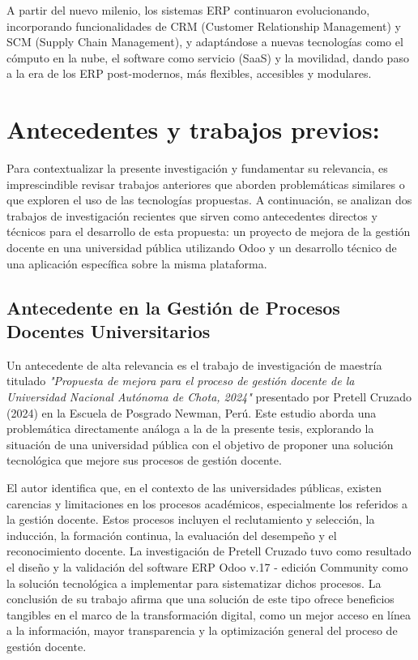 \documentclass[12pt,letterpaper,spanish]{report}
\begin{document}
A partir del nuevo milenio, los sistemas ERP continuaron evolucionando, incorporando funcionalidades de CRM (Customer Relationship Management) y SCM (Supply Chain Management), y adaptándose a nuevas tecnologías como el cómputo en la nube, el software como servicio (SaaS) y la movilidad, dando paso a la era de los ERP post-modernos, más flexibles, accesibles y modulares.
\section{Antecedentes y trabajos previos:}
\label{sec:antecedentes}

Para contextualizar la presente investigación y fundamentar su relevancia, es imprescindible revisar trabajos anteriores que aborden problemáticas similares o que exploren el uso de las tecnologías propuestas. A continuación, se analizan dos trabajos de investigación recientes que sirven como antecedentes directos y técnicos para el desarrollo de esta propuesta: un proyecto de mejora de la gestión docente en una universidad pública utilizando Odoo y un desarrollo técnico de una aplicación específica sobre la misma plataforma.

\subsection{Antecedente en la Gestión de Procesos Docentes Universitarios}
\label{sub:antecedente_gestion_docente}

Un antecedente de alta relevancia es el trabajo de investigación de maestría titulado \textit{"Propuesta de mejora para el proceso de gestión docente de la Universidad Nacional Autónoma de Chota, 2024"} presentado por Pretell Cruzado (2024) en la Escuela de Posgrado Newman, Perú. Este estudio aborda una problemática directamente análoga a la de la presente tesis, explorando la situación de una universidad pública con el objetivo de proponer una solución tecnológica que mejore sus procesos de gestión docente.

El autor identifica que, en el contexto de las universidades públicas, existen carencias y limitaciones en los procesos académicos, especialmente los referidos a la gestión docente. Estos procesos incluyen el reclutamiento y selección, la inducción, la formación continua, la evaluación del desempeño y el reconocimiento docente. La investigación de Pretell Cruzado tuvo como resultado el diseño y la validación del software ERP Odoo v.17 - edición Community como la solución tecnológica a implementar para sistematizar dichos procesos. La conclusión de su trabajo afirma que una solución de este tipo ofrece beneficios tangibles en el marco de la transformación digital, como un mejor acceso en línea a la información, mayor transparencia y la optimización general del proceso de gestión docente.
\end{document}
